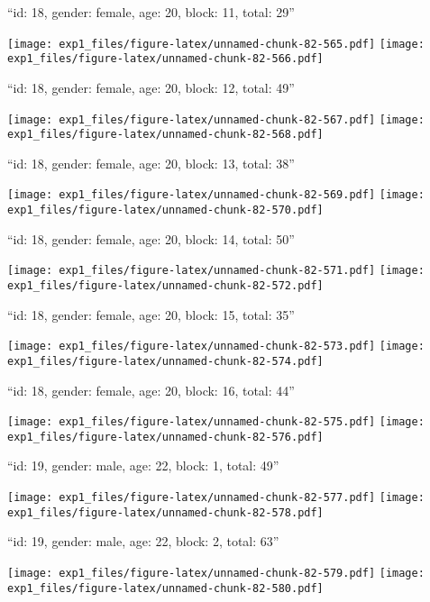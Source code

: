 \documentclass[11pt,,]{article}
\begin{document}
\newpage
[1] 

``id: 18, gender: female, age: 20, block: 11, total: 29''

\texttt{[image: exp1\_files/figure-latex/unnamed-chunk-82-565.pdf]}
\texttt{[image: exp1\_files/figure-latex/unnamed-chunk-82-566.pdf]}

\newpage
[1] 

``id: 18, gender: female, age: 20, block: 12, total: 49''

\texttt{[image: exp1\_files/figure-latex/unnamed-chunk-82-567.pdf]}
\texttt{[image: exp1\_files/figure-latex/unnamed-chunk-82-568.pdf]}

\newpage
[1] 

``id: 18, gender: female, age: 20, block: 13, total: 38''

\texttt{[image: exp1\_files/figure-latex/unnamed-chunk-82-569.pdf]}
\texttt{[image: exp1\_files/figure-latex/unnamed-chunk-82-570.pdf]}

\newpage
[1] 

``id: 18, gender: female, age: 20, block: 14, total: 50''

\texttt{[image: exp1\_files/figure-latex/unnamed-chunk-82-571.pdf]}
\texttt{[image: exp1\_files/figure-latex/unnamed-chunk-82-572.pdf]}

\newpage
[1] 

``id: 18, gender: female, age: 20, block: 15, total: 35''

\texttt{[image: exp1\_files/figure-latex/unnamed-chunk-82-573.pdf]}
\texttt{[image: exp1\_files/figure-latex/unnamed-chunk-82-574.pdf]}

\newpage
[1] 

``id: 18, gender: female, age: 20, block: 16, total: 44''

\texttt{[image: exp1\_files/figure-latex/unnamed-chunk-82-575.pdf]}
\texttt{[image: exp1\_files/figure-latex/unnamed-chunk-82-576.pdf]}

\newpage
[1] 

``id: 19, gender: male, age: 22, block: 1, total: 49''

\texttt{[image: exp1\_files/figure-latex/unnamed-chunk-82-577.pdf]}
\texttt{[image: exp1\_files/figure-latex/unnamed-chunk-82-578.pdf]}

\newpage
[1] 

``id: 19, gender: male, age: 22, block: 2, total: 63''

\texttt{[image: exp1\_files/figure-latex/unnamed-chunk-82-579.pdf]}
\texttt{[image: exp1\_files/figure-latex/unnamed-chunk-82-580.pdf]}
\end{document}
